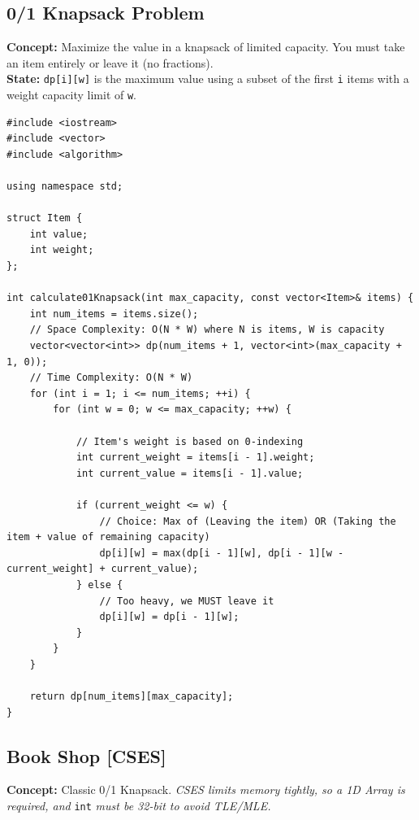 \subsection{0/1 Knapsack Problem}
\textbf{Concept:} Maximize the value in a knapsack of limited capacity.
You must take an item entirely or leave it (no fractions).
\\
\textbf{State:} \texttt{dp[i][w]} is the maximum value using a subset of the first \texttt{i} items with a weight capacity limit of \texttt{w}.

\begin{lstlisting}
#include <iostream>
#include <vector>
#include <algorithm>

using namespace std;

struct Item {
    int value;
    int weight;
};

int calculate01Knapsack(int max_capacity, const vector<Item>& items) {
    int num_items = items.size();
    // Space Complexity: O(N * W) where N is items, W is capacity
    vector<vector<int>> dp(num_items + 1, vector<int>(max_capacity + 1, 0));
    // Time Complexity: O(N * W)
    for (int i = 1; i <= num_items; ++i) {
        for (int w = 0; w <= max_capacity; ++w) {
            
            // Item's weight is based on 0-indexing
            int current_weight = items[i - 1].weight;
            int current_value = items[i - 1].value;
            
            if (current_weight <= w) {
                // Choice: Max of (Leaving the item) OR (Taking the item + value of remaining capacity)
                dp[i][w] = max(dp[i - 1][w], dp[i - 1][w - current_weight] + current_value);
            } else {
                // Too heavy, we MUST leave it
                dp[i][w] = dp[i - 1][w];
            }
        }
    }
    
    return dp[num_items][max_capacity];
}
\end{lstlisting}

\subsection{Book Shop [CSES]}
\textbf{Concept:} Classic 0/1 Knapsack. \textit{CSES limits memory tightly, so a 1D Array is required, and} \texttt{int} \textit{must be 32-bit to avoid TLE/MLE.}

